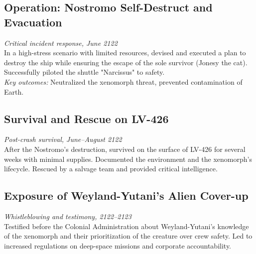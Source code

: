 \small{
\subsection*{Operation: Nostromo Self-Destruct and Evacuation}
\textit{Critical incident response, June 2122} \\
In a high-stress scenario with limited resources, devised and executed a plan to destroy the ship while ensuring the escape of the sole survivor (Jonesy the cat). Successfully piloted the shuttle "Narcissus" to safety. \\
\textit{Key outcomes:} Neutralized the xenomorph threat, prevented contamination of Earth.

\subsection*{Survival and Rescue on LV-426}
\textit{Post-crash survival, June–August 2122} \\
After the Nostromo's destruction, survived on the surface of LV-426 for several weeks with minimal supplies. Documented the environment and the xenomorph's lifecycle. Rescued by a salvage team and provided critical intelligence.

\subsection*{Exposure of Weyland-Yutani's Alien Cover-up}
\textit{Whistleblowing and testimony, 2122–2123} \\
Testified before the Colonial Administration about Weyland-Yutani's knowledge of the xenomorph and their prioritization of the creature over crew safety. Led to increased regulations on deep-space missions and corporate accountability.
}
